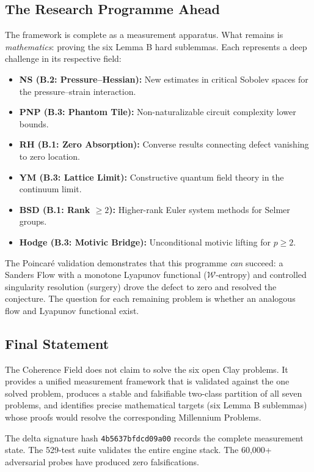\documentclass[11pt]{article}
\begin{document}
\subsection{The Research Programme Ahead}

The framework is complete as a measurement apparatus.  What remains is
\emph{mathematics}: proving the six Lemma B hard sublemmas.  Each
represents a deep challenge in its respective field:

\begin{itemize}
\item \textbf{NS (B.2: Pressure--Hessian):} New estimates in critical
Sobolev spaces for the pressure--strain interaction.
\item \textbf{PNP (B.3: Phantom Tile):} Non-naturalizable circuit
complexity lower bounds.
\item \textbf{RH (B.1: Zero Absorption):} Converse results connecting
defect vanishing to zero location.
\item \textbf{YM (B.3: Lattice Limit):} Constructive quantum field
theory in the continuum limit.
\item \textbf{BSD (B.1: Rank $\geq 2$):} Higher-rank Euler system
methods for Selmer groups.
\item \textbf{Hodge (B.3: Motivic Bridge):} Unconditional motivic
lifting for $p \geq 2$.
\end{itemize}

\noindent
The Poincar\'e validation demonstrates that this programme \emph{can}
succeed: a Sanders Flow with a monotone Lyapunov functional
($\mathcal{W}$-entropy) and controlled singularity resolution (surgery)
drove the defect to zero and resolved the conjecture.  The question for
each remaining problem is whether an analogous flow and Lyapunov
functional exist.

\subsection{Final Statement}

The Coherence Field does not claim to solve the six open Clay problems.
It provides a unified measurement framework that is validated against
the one solved problem, produces a stable and falsifiable two-class
partition of all seven problems, and identifies precise mathematical
targets (six Lemma B sublemmas) whose proofs would resolve the
corresponding Millennium Problems.

The delta signature hash \texttt{4b5637bfdcd09a00} records the complete
measurement state.  The 529-test suite validates the entire engine stack.
The 60,000+ adversarial probes have produced zero falsifications.
\end{document}
